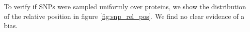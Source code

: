 
To verify if SNPs were sampled uniformly
over proteins, we show the distribution 
of the relative position in figure \ref{fig:snp_rel_pos}.
We find no clear evidence of a bias.

%
%





